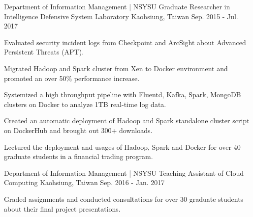 


\begin{cventries}


\cventry
{Department of Information Management | NSYSU} %
{Graduate Researcher in Intelligence Defensive System Laboratory} %
{Kaohsiung, Taiwan} %
{Sep. 2015 - Jul. 2017} %
{ %
\begin{cvitems}
\item {Evaluated security incident logs from Checkpoint and ArcSight about Advanced Persistent Threats (APT).}
\item {Migrated Hadoop and Spark cluster from Xen to Docker environment and promoted an over 50\% performance increase.}
\item {Systemized a high throughput pipeline with Fluentd, Kafka, Spark, MongoDB clusters on Docker to analyze 1TB real-time log data.}
\item {Created an automatic deployment of Hadoop and Spark standalone cluster script on DockerHub and brought out 300+ downloads.}
\item {Lectured the deployment and usages of Hadoop, Spark and Docker for over 40 graduate students in a financial trading program.}
\end{cvitems}
}


\cventry
{Department of Information Management | NSYSU} %
{Teaching Assistant of Cloud Computing} %
{Kaohsiung, Taiwan} %
{Sep. 2016 - Jan. 2017} %
{ %
\begin{cvitems}
\item {Graded assignments and conducted consultations for over 30 graduate students about their final project presentations.}
\end{cvitems}
}


\end{cventries}
